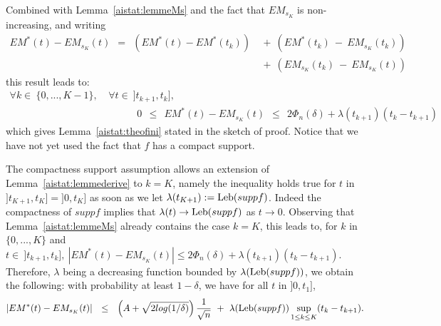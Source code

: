 \noindent Combined with Lemma~\ref{aistat:lemmeMs} and the fact that $EM_{s_K}$ is non-increasing, and writing 
\begin{align*}
EM^*(t)-EM_{s_K}(t) ~~=~~ (EM^*(t)-EM^*(t_k)) &~+~ (EM^*(t_k) ~-~ EM_{s_K}(t_k)) \\&~+~ (EM_{s_K}(t_k) ~-~ EM_{s_K}(t))
\end{align*}
this result leads to:
\begin{align*}
\forall k \in~ \{0,...,K-1\},&~ \forall t \in~ ]t_{k+1},t_{k}],
\\& ~~~~~~~~~~~~~~0 ~~\le~~ EM^*(t)-EM_{s_K}(t) ~~\le~~ 2 \Phi_n(\delta)+\lambda(t_{k+1})(t_{k}-t_{k+1}) 
\end{align*}
which gives Lemma~\ref{aistat:theofini} stated in the sketch of proof. Notice that we have not yet used the fact that $f$ has a compact support.


The compactness support assumption allows an extension of Lemma~\ref{aistat:lemmederive} to $k=K$, namely the inequality holds true for $t$ in $]t_{K+1},t_K]=]0,t_K]$ as soon as we let $\lambda(t_{K+1}):=\text{Leb}(supp f)$. Indeed the compactness of $supp f$ implies that $\lambda(t) \rightarrow \text{Leb}(supp f)$ as $t \rightarrow 0$. Observing that Lemma~\ref{aistat:lemmeMs} already contains the case $k=K$, this leads to, for $k$ in $\{0,...,K\}$ and $t \in~ ]t_{k+1},t_{k}],~ |EM^*(t)-EM_{s_K}(t)| \le 2 \Phi_n(\delta)+\lambda(t_{k+1})(t_{k}-t_{k+1})$. Therefore, $\lambda$ being a decreasing function bounded by $\lambda(\text{Leb}(supp f))$, we obtain the following: with probability at least $1-\delta$, we have for all $t$ in $]0,t_{1}]$,
\begin{align*}
|EM^*(t)-EM_{s_K}(t)| 
~~\le~~  \left(A+\sqrt{2log(1/\delta)}\right)\frac{1}{\sqrt n}~+~ \lambda(\text{Leb}(supp f))\sup_{1\leq k \le K}(t_{k}-t_{k+1}).
\end{align*}



